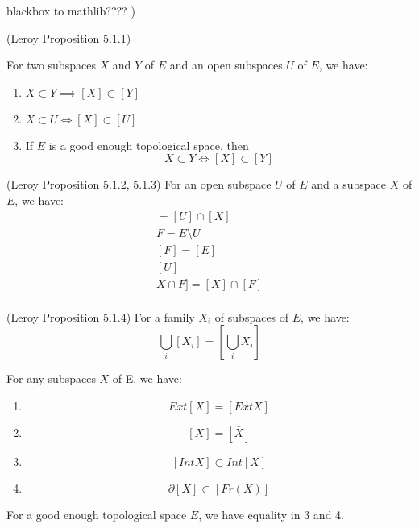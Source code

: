 \begin{definition}
    \label{def:good_enough_topological_space}
    blackbox to mathlib???? )
\end{definition}

\begin{lemma}
(Leroy Proposition 5.1.1)
    \label{lem:subset_to_sublocal_part_1}

    For two subspaces $X$ and $Y$ of $E$ and an open subspaces $U$ of $E$, we have:
    \begin{enumerate}
        \item $X \subset Y \implies [X] \subset [Y]$
        \item $X \subset U \iff [X] \subset [U]$
        \item If $E$ is a good enough topological space, then \[X \subset Y \iff [X] \subset [Y]\]
    \end{enumerate}
\end{lemma}

\begin{lemma}
(Leroy Proposition 5.1.2, 5.1.3)
    \label{lem:subset_to_sublocal_part_2}
    For an open subspace $U$ of $E$ and a subspace $X$ of $E$, we have:
    \begin{gather*}
    [U \cap X]
        = [U] \cap [X]\\
        F = E \setminus U\\
        [F] = [E] \\ [U]\\
        X \cap F] = [X] \cap [F]\\
    \end{gather*}

\end{lemma}

\begin{lemma}
(Leroy Proposition 5.1.4)
    \label{lem:unions_of_subspaces}
    For a family $X_i$ of subspaces of $E$, we have:
    \[\bigcup_i [X_i] = [\bigcup_i X_i]\]
\end{lemma}

\begin{lemma}[Part 3]
    \label{lem:subspaces_part_3}
    For any subspaces $X$ of E, we have:
    \begin{enumerate}
        \item \[Ext[X] = [Ext X]\]
        \item \[\bar{[X]} = [\bar{X}]\]
        \item \[[Int X] \subset Int[X]\]
        \item \[\partial[X] \subset [Fr(X)]\]
    \end{enumerate}
    For a good enough topological space $E$, we have equality in 3 and 4.
\end{lemma}


